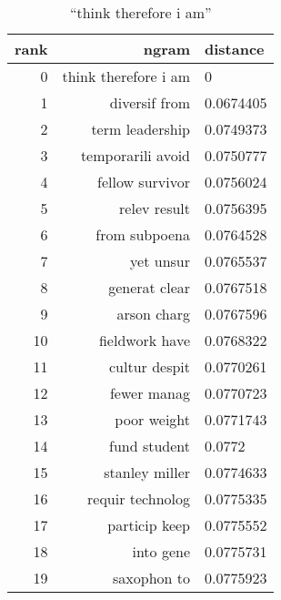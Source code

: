 \begin{table}[ht]
    \begin{subtable}[t]{.45\textwidth}
        \centering
        \begin{tabularx}{\textwidth}{r R l}
            \toprule
            rank & ngram & distance\\
            \midrule
            \num{0} & think therefore i am & \num{0}\\
            \num{1} & diversif from & \num{0.0674405}\\
            \num{2} & term leadership & \num{0.0749373}\\
            \num{3} & temporarili avoid & \num{0.0750777}\\
            \num{4} & fellow survivor & \num{0.0756024}\\
            \midrule
            \num{5} & relev result & \num{0.0756395}\\
            \num{6} & from subpoena & \num{0.0764528}\\
            \num{7} & yet unsur & \num{0.0765537}\\
            \num{8} & generat clear & \num{0.0767518}\\
            \num{9} & arson charg & \num{0.0767596}\\
            \num{10} & fieldwork have & \num{0.0768322}\\
            \num{11} & cultur despit & \num{0.0770261}\\
            \num{12} & fewer manag & \num{0.0770723}\\
            \num{13} & poor weight & \num{0.0771743}\\
            \num{14} & fund student & \num{0.0772}\\
            \num{15} & stanley miller & \num{0.0774633}\\
            \num{16} & requir technolog & \num{0.0775335}\\
            \num{17} & particip keep & \num{0.0775552}\\
            \num{18} & into gene & \num{0.0775731}\\
            \num{19} & saxophon to & \num{0.0775923}\\
            \bottomrule
        \end{tabularx}
        \caption{\enquote{think therefore i am}}\label{tab:ranking_chance_1}
    \end{subtable}
    \hfill
    \begin{subtable}[t]{.45\textwidth}

\end{subtable}
\end{table}
